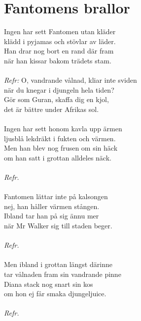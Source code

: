 \section{Fantomens brallor}
Ingen har sett Fantomen utan kläder\\
klädd i pyjamas och stövlar av läder.\\
Han drar nog bort en rand där fram\\
när han kissar bakom trädets stam.\\
\\
\textit{Refr:}
O, vandrande vålnad, kliar inte sviden\\
när du knegar i djungeln hela tiden?\\
Gör som Guran, skaffa dig en kjol,\\
det är bättre under Afrikas sol.\\
\\
Ingen har sett honom kavla upp ärmen\\
ljusblå lekdräkt i fukten och värmen.\\
Men han blev nog frusen om sin häck\\
om han satt i grottan alldeles näck.\\
\\
\textit{Refr.}\\
\\
Fantomen lättar inte på kalsongen\\
nej, han håller värmen stången.\\
Ibland tar han på sig ännu mer\\
när Mr Walker sig till staden beger.\\
\\
\textit{Refr.}\\
\\
Men ibland i grottan längst därinne\\
tar vålnaden fram sin vandrande pinne\\
Diana stack nog snart sin kos\\
om hon ej får smaka djungeljuice.\\
\\
\textit{Refr.}

